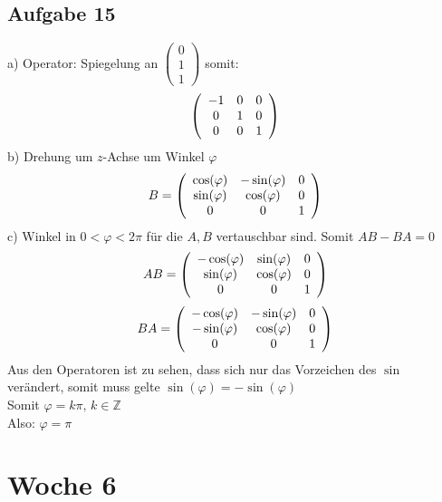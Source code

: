 \documentclass{article}
\begin{document}
\subsection*{Aufgabe 15}
a) Operator: Spiegelung an $\left(\begin{array}{c}0\\1\\1\end{array}\right)$ somit:
\begin{equation*}
    \left(\begin{array}{c c c}
        -1&0&0\\0&1&0\\0&0&1
    \end{array}\right)
\end{equation*}
b) Drehung um $z$-Achse um Winkel $\varphi$
\begin{eqnarray*}
    B= \left(\begin{array}{c c c}
        \cos(\varphi)&-\sin(\varphi)&0\\
        \sin(\varphi)&\cos(\varphi)&0\\
        0&0&1
    \end{array}\right)
\end{eqnarray*}
c) Winkel in $0<\varphi<2\pi$ für die $A,B$ vertauschbar sind. Somit $AB - BA = 0$
\begin{equation*}
    AB = \left(\begin{array}{c c c}
        -\cos(\varphi)&\sin(\varphi)&0\\
        \sin(\varphi)&\cos(\varphi)&0\\
        0&0&1
    \end{array}\right)
\end{equation*}
\begin{equation*}
    BA = \left(\begin{array}{c c c}
        -\cos(\varphi)&-\sin(\varphi)&0\\
        -\sin(\varphi)&\cos(\varphi)&0\\
        0&0&1
    \end{array}\right)
\end{equation*}
Aus den Operatoren ist zu sehen, dass sich nur das Vorzeichen des $\sin$ verändert, somit muss gelte $\sin(\varphi) = -\sin(\varphi)$\\
Somit $\varphi = k\pi,\, k \in \mathbb{Z}$\\
Also: $\varphi = \pi$ 

\section*{Woche 6}
\end{document}
